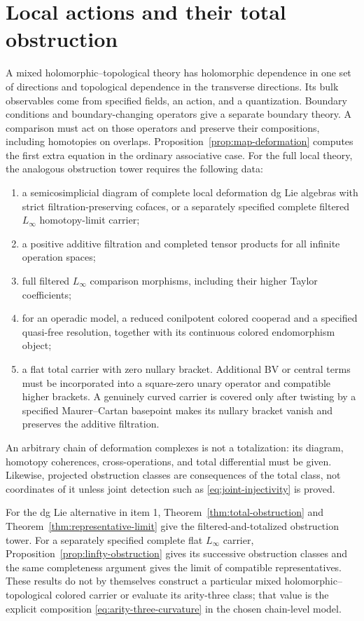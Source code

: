 \documentclass[11pt]{article}
\theoremstyle{definition}
\theoremstyle{remark}
\begin{document}
\section{Local actions and their total obstruction}

A mixed holomorphic--topological theory has holomorphic dependence in one
set of directions and topological dependence in the transverse directions.
Its bulk observables come from specified fields, an action, and a
quantization.  Boundary conditions and boundary-changing operators give
a separate boundary theory.  A comparison must act on those operators
and preserve their compositions, including homotopies on overlaps.
Proposition~\ref{prop:map-deformation} computes the first extra equation in
the ordinary associative case.  For the full local theory, the analogous
obstruction tower requires the following data:
\begin{enumerate}
 \item a semicosimplicial diagram of complete local deformation dg Lie
 algebras with strict filtration-preserving cofaces, or a separately
 specified complete filtered $L_\infty$ homotopy-limit carrier;
 \item a positive additive filtration and completed tensor products for all
 infinite operation spaces;
 \item full filtered $L_\infty$ comparison morphisms, including their higher
 Taylor coefficients;
 \item for an operadic model, a reduced conilpotent colored cooperad and a
 specified quasi-free resolution, together with its continuous colored
 endomorphism object;
 \item a flat total carrier with zero nullary bracket.  Additional BV or
 central terms must be incorporated into a square-zero unary operator and
 compatible higher brackets.  A genuinely curved carrier is covered only
 after twisting by a specified Maurer--Cartan basepoint makes its nullary
 bracket vanish and preserves the additive filtration.
\end{enumerate}
An arbitrary chain of deformation complexes is not a totalization: its
diagram, homotopy coherences, cross-operations, and total differential must
be given.  Likewise, projected obstruction classes are consequences of the
total class, not coordinates of it unless joint detection such as
\eqref{eq:joint-injectivity} is proved.

For the dg Lie alternative in item 1, Theorem~\ref{thm:total-obstruction} and
Theorem~\ref{thm:representative-limit} give the filtered-and-totalized
obstruction tower.  For a separately specified complete flat
$L_\infty$ carrier, Proposition~\ref{prop:linfty-obstruction} gives its
successive obstruction classes and the same completeness argument gives the
limit of compatible representatives.  These results do not by themselves
construct a particular mixed holomorphic--topological colored carrier or
evaluate its arity-three class; that value is the explicit composition
\eqref{eq:arity-three-curvature} in the chosen chain-level model.
\end{document}
